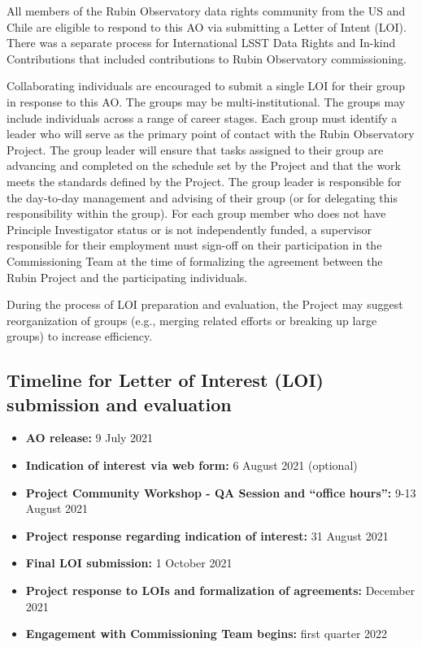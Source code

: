 \documentclass[SE,authoryear,toc]{lsstdoc}
\begin{document}
All members of the Rubin Observatory data rights community from the US and Chile  are eligible to respond to this AO via submitting a Letter of Intent (LOI). There was a separate process for International LSST Data Rights and In-kind Contributions that included contributions to Rubin Observatory commissioning.

Collaborating individuals are encouraged to submit a single LOI for their group in response to this AO. The groups may be multi-institutional. The groups may include individuals across a range of career stages. Each group must identify a leader who will serve as the primary point of contact with the Rubin Observatory Project. The group leader will ensure that tasks assigned to their group are advancing and completed on the schedule set by the Project and that the work meets the standards defined by the Project. The group leader is responsible for the day-to-day management and advising of their group (or for delegating this responsibility within the group). For each group member who does not have Principle Investigator status or is not independently funded, a supervisor responsible for their employment must sign-off on their participation in the Commissioning Team at the time of formalizing the agreement between the Rubin Project and the participating individuals.

During the process of LOI preparation and evaluation, the Project may suggest reorganization of groups (e.g., merging related efforts or breaking up large groups) to increase efficiency.

\subsection{Timeline for Letter of Interest (LOI) submission and evaluation}

\begin{itemize}
\item \textbf{AO release:} 9 July 2021
\item \textbf{Indication of interest via web form:} 6 August 2021 (optional)
\item \textbf{Project Community Workshop - QA Session and ``office hours'':} 9-13 August 2021
\item \textbf{Project response regarding indication of interest:} 31 August 2021
\item \textbf{Final LOI submission:} 1 October 2021
\item \textbf{Project response to LOIs and formalization of agreements:} December 2021
\item \textbf{Engagement with Commissioning Team begins:} first quarter 2022
\end{itemize}
\end{document}
